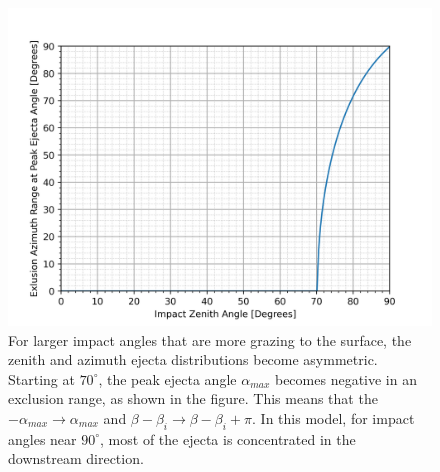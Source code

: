 \documentclass{hitec}
\begin{document}
\begin{figure}[h!]
	\centering
	\includegraphics[scale=0.65]{ExlusionRange_vs_ImpactAngle.png}
	\caption{For larger impact angles that are more grazing to the surface, the zenith and azimuth ejecta distributions become asymmetric. Starting at $70^\circ$, the peak ejecta angle $\alpha_{max}$ becomes negative in an exclusion range, as shown in the figure. This means that the $-\alpha_{max}\to\alpha_{max}$ and $\beta-\beta_i\to \beta-\beta_i +\pi$. In this model, for impact angles near $90^\circ$, most of the ejecta is concentrated in the downstream direction.}\label{fig:ExlusionRange_vs_ImpactAngle}
\end{figure}

%
\end{document}
